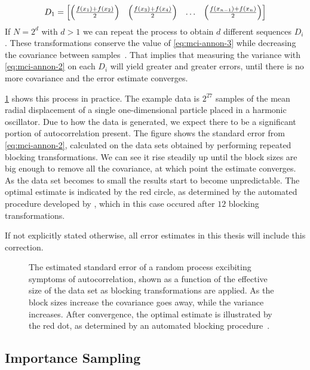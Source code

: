 \documentclass[Thesis.tex]{subfiles}
\begin{document}
\begin{align}
  D_1 = \mqty[\qty(\frac{f(x_1) + f(x_2)}{2}) & \qty(\frac{f(x_3) + f(x_4)}{2}) & \dots & \qty(\frac{f(x_{n-1}) + f(x_n)}{2})]
\end{align}
If $N = 2^d$ with $d > 1$ we can repeat the process to obtain $d$ different
sequences $D_i$. These transformations conserve the value of \cref{eq:mci-annon-3}
while decreasing the covariance between samples~\cite{Jonsson-2018}. That implies that measuring
the variance with \cref{eq:mci-annon-2} on each $D_i$ will yield greater and
greater errors, until there is no more covariance and the error estimate
converges.

\cref{fig:blocking-example-diagram} shows this process in practice. The example
data is $2^{27}$ samples of the mean radial displacement of a single
one-dimensional particle placed in a harmonic oscillator. Due to how the data is
generated, we expect there to be a significant portion of autocorrelation
present. The figure shows the standard error from \cref{eq:mci-annon-2},
calculated on the data sets obtained by performing repeated blocking
transformations. We can see it rise steadily up until the block sizes are big
enough to remove all the covariance, at which point the estimate converges. As
the data set becomes to small the results start to become unpredictable. The
optimal estimate is indicated by the red circle, as determined by the automated
procedure developed by \textcite{Jonsson-2018}, which in this case occured after
$\num{12}$ blocking transformations.

If not explicitly stated otherwise, all error estimates in this thesis will
include this correction.


\begin{figure}[h]
  \centering
  \resizebox{0.7\linewidth}{!}{%
    
  }
  \caption{The estimated standard error of a random process excibiting symptoms
    of autocorrelation, shown as a function of the effective size of the data set as
    blocking transformations are applied. As the block sizes increase the
    covariance goes away, while the variance increases. After convergence, the
    optimal estimate is illustrated by the red dot, as determined by an automated blocking
    procedure~\cite{Jonsson-2018}.}
  \label{fig:blocking-example-diagram}
\end{figure}



\subsection{Importance Sampling}
\end{document}
